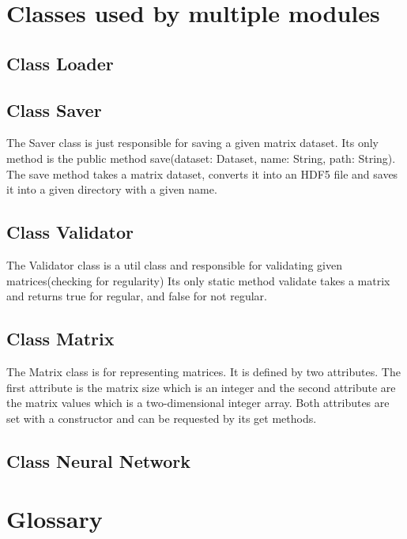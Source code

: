 \documentclass[parskip=full]{scrartcl}
\begin{document}
\newpage
\section{Classes used by multiple modules}

\subsection{Class Loader}
\subsection{Class Saver}
The Saver class is just responsible for saving a given matrix dataset.
Its only method is the public method save(dataset: Dataset, name: String, path: String).
The save method takes a matrix dataset, converts it into an HDF5 file and saves it into a given directory with a given name.
\subsection{Class Validator}
The Validator class is a util class and responsible for validating given matrices(checking for regularity)
Its only static method validate takes a matrix and returns true for regular, and false for not regular.

\subsection{Class Matrix}
The Matrix class is for representing matrices. It is defined by two attributes. The first attribute is the matrix size which is an integer and the second attribute are the matrix values which is a two-dimensional integer array. Both attributes are set with a constructor and can be requested by its get methods.

\subsection{Class Neural Network}


\newpage
\section{Glossary}

%
\printnoidxglossaries
\end{document}
